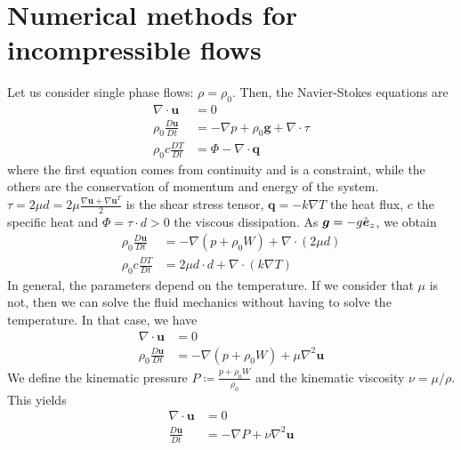 \documentclass[12pt, openany]{report}
\theoremstyle{definition}
\begin{document}
\chapter{Numerical methods for incompressible flows}
Let us consider single phase flows: $\rho=\rho_0$. Then, the Navier-Stokes equations are 
\begin{equation}
	\begin{aligned}
		\nabla \cdot \boldsymbol{u}&=0\\
		\rho_0 \frac{D\boldsymbol{u}}{Dt} &= -\nabla p + \rho_0\boldsymbol{g} + \nabla \cdot \tau \\
		\rho_0c\frac{DT}{Dt} &=\Phi - \nabla \cdot \boldsymbol{q}
	\end{aligned}
\end{equation}
where the first equation comes from continuity and is a constraint, while the others are the conservation of momentum and energy of the system. $\tau=2\mu d = 2\mu \frac{\nabla \boldsymbol{u}+\nabla \boldsymbol{u}^T}{2}$ is the shear stress tensor, $\boldsymbol{q}=-k \nabla T$ the heat flux, $c$ the specific heat and $\Phi=\tau\cdot d>0$ the viscous dissipation. As $\boldsymbol{g}=-g\Hat{\boldsymbol{e}}_z$, we obtain 
\begin{equation}
	\begin{aligned}
		\rho_0 \frac{D\boldsymbol{u}}{Dt} &= -\nabla \left(p+\rho_0W\right) + \nabla \cdot (2\mu d)\\
		\rho_0c\frac{DT}{Dt} &= 2\mu d\cdot d + \nabla \cdot (k\nabla T)
	\end{aligned}
\end{equation}
In general, the parameters depend on the temperature. If we consider that $\mu$ is not, then we can solve the fluid mechanics without having to solve the temperature. In that case, we have 
\begin{equation}
\begin{aligned}
\nabla \cdot \boldsymbol{u} &= 0 \\
\rho_0 \frac{D\boldsymbol{u}}{Dt} &= -\nabla \left(p+\rho_0 W\right) + \mu \nabla^2 \boldsymbol{u}
\end{aligned}
\end{equation}
We define the kinematic pressure $P\coloneqq \frac{p+\rho_0W}{\rho_0}$ and the kinematic viscosity $\nu = \mu/\rho$. This yields 
\begin{equation}\label{eq:NS}
	\boxed{
		\begin{aligned}
			\nabla \cdot \boldsymbol{u}&=0\\
			\frac{D\boldsymbol{u}}{Dt} &= - \nabla P + \nu \nabla^2 \boldsymbol{u}
		\end{aligned}
	}
\end{equation}
\end{document}
